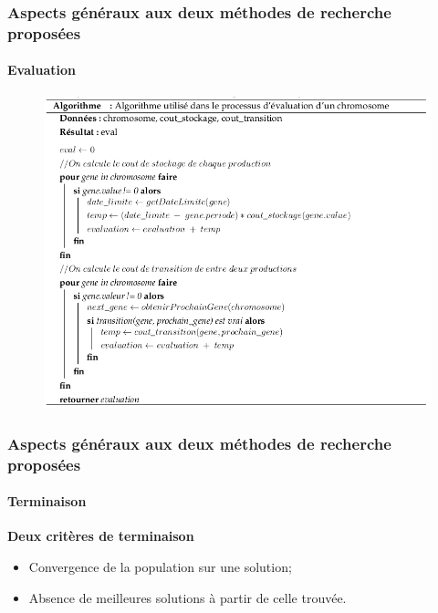 \documentclass[11pt]{beamer}
\begin{document}
 \begin{frame}
 \frametitle{Aspects généraux aux deux méthodes de recherche proposées}
 \framesubtitle{Evaluation}
	
	\begin{figure}[!h]
		\begin{center}
			\includegraphics[scale=.4
			]{img/eval_algo.png}
		\end{center}
 \end{figure}
	
 \end{frame}
 
 \begin{frame}
 \frametitle{Aspects généraux aux deux méthodes de recherche proposées}
 \framesubtitle{Terminaison}
	
	\textbf{Deux critères de terminaison}
	\begin{itemize}
		\item Convergence de la population sur une solution;
		\item Absence de meilleures solutions à partir de celle trouvée.
	\end{itemize}
	
 \end{frame}
 
\end{document}
